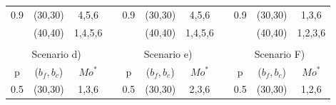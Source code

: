\begin{table}[htbp]
{\begin{tabular}{ccccccccccc}
\multicolumn{1}{|c|}{\multirow{2}{*}{0.9}} & \multicolumn{1}{c|}{(30,30)}     & \multicolumn{1}{c|}{4,5,6}   & \multicolumn{1}{c|}{} & \multicolumn{1}{c|}{\multirow{2}{*}{0.9}} & \multicolumn{1}{c|}{(30,30)}     & \multicolumn{1}{c|}{4,5,6}   & \multicolumn{1}{c|}{} & \multicolumn{1}{c|}{0.9}                  & \multicolumn{1}{c|}{(30,30)}     & \multicolumn{1}{c|}{1,3,6}   \\ \cline{2-3} \cline{6-7} \cline{9-11} 
\multicolumn{1}{|c|}{}                     & \multicolumn{1}{c|}{(40,40)}     & \multicolumn{1}{c|}{1,4,5,6} & \multicolumn{1}{c|}{} & \multicolumn{1}{c|}{}                     & \multicolumn{1}{c|}{(40,40)}     & \multicolumn{1}{c|}{1,4,5,6} & \multicolumn{1}{c|}{} & \multicolumn{1}{c|}{}                     & \multicolumn{1}{c|}{(40,40)}     & \multicolumn{1}{c|}{1,2,3,6} \\ \cline{1-3} \cline{5-7} \cline{9-11} 
                                           &                                  &                              &                       &                                           &                                  &                              &                       &                                           &                                  &                              \\
\multicolumn{3}{c}{Scenario d)}                                                                              &                       & \multicolumn{3}{c}{Scenario e)}                                                                             &                       & \multicolumn{3}{c}{Scenario F)}                                                                             \\ \cline{1-3} \cline{5-7} \cline{9-11} 
\multicolumn{1}{|c|}{p}                    & \multicolumn{1}{c|}{($b_f,b_c$)} & \multicolumn{1}{c|}{$Mo^*$}  & \multicolumn{1}{c|}{} & \multicolumn{1}{c|}{p}                    & \multicolumn{1}{c|}{($b_f,b_c$)} & \multicolumn{1}{c|}{$Mo^*$}  & \multicolumn{1}{c|}{} & \multicolumn{1}{c|}{p}                    & \multicolumn{1}{c|}{($b_f,b_c$)} & \multicolumn{1}{c|}{$Mo^*$}  \\ \cline{1-3} \cline{5-7} \cline{9-11} 
\multicolumn{1}{|c|}{\multirow{2}{*}{0.5}} & \multicolumn{1}{c|}{(30,30)}     & \multicolumn{1}{c|}{1,3,6}   & \multicolumn{1}{c|}{} & \multicolumn{1}{c|}{\multirow{2}{*}{0.5}} & \multicolumn{1}{c|}{(30,30)}     & \multicolumn{1}{c|}{2,3,6}   & \multicolumn{1}{c|}{} & \multicolumn{1}{c|}{\multirow{2}{*}{0.5}} & \multicolumn{1}{c|}{(30,30)}     & \multicolumn{1}{c|}{1,2,6}   \\ \cline{2-3} \cline{6-7} \cline{10-11} 

\end{tabular}}
\end{table}
